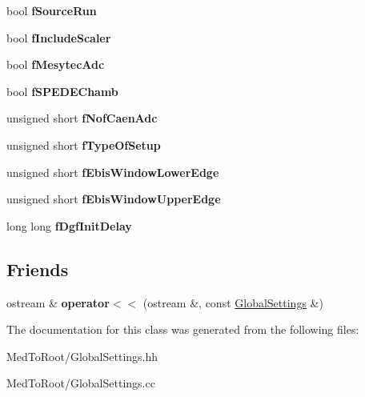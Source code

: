 \begin{DoxyCompactItemize}
\item 
\hypertarget{class_global_settings_ab91214dfb8843edede96c9a0a6b43af4}{bool {\bfseries f\-Source\-Run}}\label{class_global_settings_ab91214dfb8843edede96c9a0a6b43af4}

\item 
\hypertarget{class_global_settings_a8f72ba223b743b631ef8a5d5326e2cc1}{bool {\bfseries f\-Include\-Scaler}}\label{class_global_settings_a8f72ba223b743b631ef8a5d5326e2cc1}

\item 
\hypertarget{class_global_settings_a07a745de62188ac45111e5a0a53ee2a5}{bool {\bfseries f\-Mesytec\-Adc}}\label{class_global_settings_a07a745de62188ac45111e5a0a53ee2a5}

\item 
\hypertarget{class_global_settings_a24efecbf225ff6579002125d0717581d}{bool {\bfseries f\-S\-P\-E\-D\-E\-Chamb}}\label{class_global_settings_a24efecbf225ff6579002125d0717581d}

\item 
\hypertarget{class_global_settings_a3a834ca5fe537c8ee1a6eaee52fedf24}{unsigned short {\bfseries f\-Nof\-Caen\-Adc}}\label{class_global_settings_a3a834ca5fe537c8ee1a6eaee52fedf24}

\item 
\hypertarget{class_global_settings_a7cfa68e7cba82725e43b12bcf85795fa}{unsigned short {\bfseries f\-Type\-Of\-Setup}}\label{class_global_settings_a7cfa68e7cba82725e43b12bcf85795fa}

\item 
\hypertarget{class_global_settings_a7ec5e9d460b0b4571c04ad7c6ae783ee}{unsigned short {\bfseries f\-Ebis\-Window\-Lower\-Edge}}\label{class_global_settings_a7ec5e9d460b0b4571c04ad7c6ae783ee}

\item 
\hypertarget{class_global_settings_a72672076f3067f6866a4843f51e5311f}{unsigned short {\bfseries f\-Ebis\-Window\-Upper\-Edge}}\label{class_global_settings_a72672076f3067f6866a4843f51e5311f}

\item 
\hypertarget{class_global_settings_abc519c30d68b6a40a89850064cda3c64}{long long {\bfseries f\-Dgf\-Init\-Delay}}\label{class_global_settings_abc519c30d68b6a40a89850064cda3c64}

\end{DoxyCompactItemize}
\subsection*{Friends}
\begin{DoxyCompactItemize}
\item 
\hypertarget{class_global_settings_ac6ab153308b559e7d080396b0fc7183b}{ostream \& {\bfseries operator$<$$<$} (ostream \&, const \hyperlink{class_global_settings}{Global\-Settings} \&)}\label{class_global_settings_ac6ab153308b559e7d080396b0fc7183b}

\end{DoxyCompactItemize}


The documentation for this class was generated from the following files\-:\begin{DoxyCompactItemize}
\item 
Med\-To\-Root/Global\-Settings.\-hh\item 
Med\-To\-Root/Global\-Settings.\-cc\end{DoxyCompactItemize}
